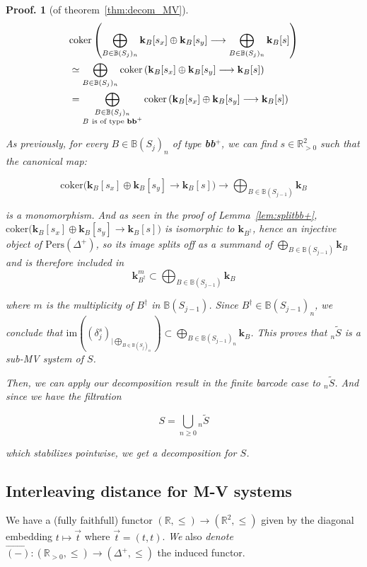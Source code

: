 \documentclass[a4paper, english, 11pt]{article}
\newcommand{\kk}[0]{\textbf{k}}
\newcommand{\0}{\vec{0}}
\newcommand{\R}[0]{\mathbb{R}}
\newcommand{\Pers}[0]{\text{Pers}}
\newtheorem*{pf}{Proof.} }
\begin{document}
\begin{pf}[of theorem~\ref{thm:decom_MV}]
 \begin{align*}
     & \text{coker} \left ( \bigoplus_{B\in \mathbb{B}(S_j)_n } \kk_{B}[s_x] \oplus  \kk_{B} [s_y] \longrightarrow \bigoplus_{B\in \mathbb{B}(S_j)_n } \kk_{B}[s]  \right )   \\ 
     &\simeq \bigoplus_{B\in \mathbb{B}(S_j)_n }  \text{coker} \left ( \kk_{B}[s_x] \oplus  \kk_{B} [s_y] \longrightarrow  \kk_{B}[s] \right ) \\
     &=  \bigoplus_{ \substack{B\in \mathbb{B}(S_j)_n\\ B ~\text{is of type \textbf{bb$^+$}} } } \text{coker} \left ( \kk_{B}[s_x] \oplus  \kk_{B} [s_y] \longrightarrow  \kk_{B}[s] \right ) 
 \end{align*} 
 
As previously, for every $B\in \mathbb{B}(S_j)_n$ of type \textbf{bb$^+$}, we can find $s\in \R^2_{>0}$ such that the canonical map: 

$$ \text{coker} \big ( \kk_{B}[s_x] \oplus  \kk_{B} [s_y] \longrightarrow  \kk_{B}[s] \big  )  \longrightarrow \bigoplus_{B\in \mathbb{B}(S_{j-1}) } \kk_{B} $$

is a monomorphism. And as seen in the proof of Lemma~\ref{lem:splitbb+}, $ \text{coker} \big ( \kk_{B}[s_x] \oplus  \kk_{B} [s_y] \longrightarrow  \kk_{B}[s] \big  ) $ is isomorphic to $\kk_{B^\dag}$, hence an injective object of $\Pers(\Delta^+)$, so its image splits off as a summand of $\bigoplus_{B\in \mathbb{B}(S_{j-1}) } \kk_{B}$ and is therefore included in  
$$  \kk_{B^\dag}^m\subset \bigoplus_{B\in \mathbb{B}(S_{j-1}) } \kk_B $$

where $m$ is the multiplicity of $B^\dag$ in $\mathbb{B}(S_{j-1}) $. Since $B^\dag\in \mathbb{B}(S_{j-1})_n$, we conclude that $\text{im} ((\delta_j^s)_{|\bigoplus_{B\in \mathbb{B}(S_j)_n}}) \subset \bigoplus_{B\in \mathbb{B}(S_{j-1})_n } \kk_{B} $. This proves that ${}_n\tilde{S}$ is a sub-MV system of $S$.

Then, we can apply our decomposition result in the finite barcode case to ${}_n\tilde{S}$. And since we have the filtration

$$S = \bigcup_{n\geq 0} {}_n\tilde{S} $$

which stabilizes pointwise, we get a decomposition for $S$.
\end{pf}

\subsection{Interleaving distance for M-V systems}
We have a (fully faithfull) functor $(\R ,\leq) \to (\R^2, \leq)$ given by the diagonal embedding  $t\mapsto \vec{t}$ where $\vec{t}=(t,t)$. \emph{We} also \emph{denote} $\overrightarrow{(-)}: (\R_{>0} ,\leq) \to (\Delta^+, \leq)$  the induced functor. 
\end{document}
